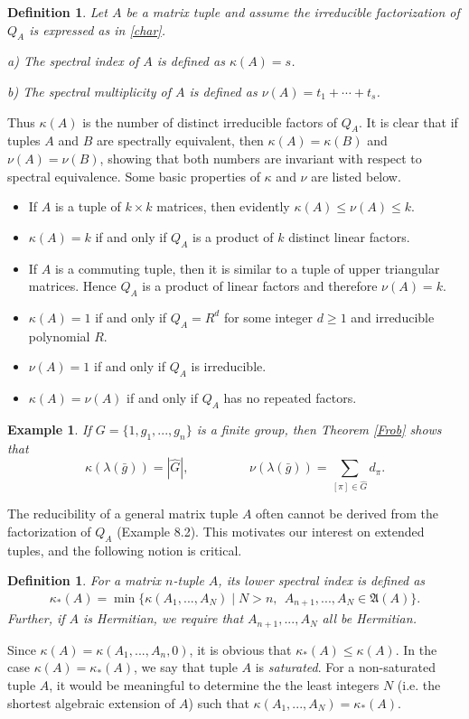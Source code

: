 \documentclass[draft, 12pt, reqno]{amsart}
\numberwithin{equation}{section}
\theoremstyle{plain}
\newtheorem{example}[theorem]{Example}
\newtheorem{definition}[theorem]{Definition}
\begin{document}
\begin{definition}\label{s-index}
Let $A$ be a matrix tuple and assume the irreducible factorization of $Q_A$ is expressed as in \eqref{char}.

a) The {\em spectral index} of $A$ is defined as $\kappa (A)=s$.

b) The {\em spectral multiplicity} of $A$ is defined as $\nu(A)=t_1+\cdots +t_s$.
\end{definition}
\noindent Thus $\kappa(A)$ is the number of distinct irreducible factors of $Q_A$. It is clear that if tuples $A$ and $B$ are spectrally equivalent, then $\kappa(A)=\kappa(B)$ and $\nu(A)=\nu(B)$, showing that both numbers are invariant with respect to spectral equivalence. Some basic properties of $\kappa$ and $\nu$ are listed below.
\begin{itemize}
\item If $A$ is a tuple of $k\times k$ matrices, then evidently $\kappa (A)\leq \nu(A)\leq k$.
\item $\kappa(A)=k$ if and only if $Q_A$ is a product of $k$ distinct linear factors. 
\item If $A$ is a commuting tuple, then it is similar to a tuple of upper triangular matrices. Hence $Q_A$ is a product of linear factors and therefore $\nu(A)=k$.
\item $\kappa(A)=1$ if and only if $Q_A=R^d$ for some integer $d\geq 1$ and irreducible polynomial $R$.
\item $\nu(A)=1$ if and only if $Q_A$ is irreducible.
\item $\kappa(A)=\nu(A)$ if and only if $Q_A$ has no repeated factors. 
\end{itemize}

\begin{example}
If $G=\{1, g_1, ..., g_n\}$ is a finite group, then Theorem \ref{Frob} shows that \[\kappa (\lambda(\bar{g}))=|\hat{G}|,\hspace{2cm} \nu(\lambda(\bar{g}))=\sum_{[\pi]\in \hat{G}}d_\pi.\]
\end{example}

The reducibility of a general matrix tuple $A$ often cannot be derived from the factorization of $Q_A$ (Example 8.2). This motivates our interest on extended tuples, and the following notion is critical.
\begin{definition}\label{lowerindex}
For a matrix $n$-tuple $A$, its {\em lower spectral index} is defined as 
\begin{align*}
\kappa_*(A)=\min \{\kappa(A_1, ..., A_N)\mid N> n, \ \ A_{n+1}, ..., A_N\in \mathfrak{A}(A)\}.
\end{align*}
Further, if $A$ is Hermitian, we require that $A_{n+1}, ..., A_N$ all be Hermitian.
\end{definition}
Since $\kappa (A)=\kappa (A_1, ..., A_n, 0)$, it is obvious that $\kappa_*(A)\leq \kappa(A)$. In the case $\kappa(A)=\kappa_*(A)$, we say that tuple $A$ is {\em saturated}. For a non-saturated tuple $A$, it would be meaningful to determine the the least integers $N$ (i.e. the shortest algebraic extension of $A$) such that $\kappa(A_1, ..., A_N)=\kappa_*(A)$.
\end{document}
